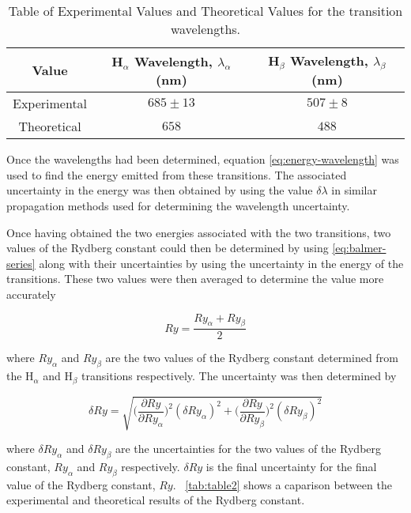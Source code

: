 \documentclass{article}
\newcommand{\tabref}[2][\tablename~]{#1\ref{#2}}
\begin{document}
\vspace{5mm}
\begin{table*}[h]
\centering %
\caption{Table of Experimental Values and Theoretical Values for the transition wavelengths.}
\label{tab:table1}
\begin{tabular}{|c|c|c|}
\hline
Value & H$_\alpha$ Wavelength, $\lambda_{\alpha}$ (nm) & H$_\beta$ Wavelength, $\lambda_{\beta}$ (nm) \\
\hline
Experimental & $685 \pm 13$ & $507 \pm 8$ \\
\hline
Theoretical \cite{Paper01} & $658$ & $488$ \\
\hline
\end{tabular}
\end{table*}


\vspace{2mm}
\noindent
Once the wavelengths had been determined, equation \eqref{eq:energy-wavelength} was used to find the energy emitted from these transitions. The associated uncertainty in the energy was then obtained by using the value $\delta\lambda$ in similar propagation methods used for determining the wavelength uncertainty. 

\vspace{2mm}
\noindent
Once having obtained the two energies associated with the two transitions, two values of the Rydberg constant could then be determined by using \eqref{eq:balmer-series} along with their uncertainties by using the uncertainty in the energy of the transitions. These two values were then averaged to determine the value more accurately

\begin{equation}
\label{eq:Rydberg-const}
Ry = \frac{Ry_{\alpha} + Ry_{\beta}}{2}
\end{equation}

\vspace{2mm}
\noindent
where $Ry_{\alpha}$ and $Ry_{\beta}$ are the two values of the Rydberg constant determined from the H$_\alpha$ and H$_\beta$ transitions respectively. The uncertainty was then determined by

\begin{equation}
\label{eq:Rydberg-error}
\delta Ry = \sqrt{\bigg(\frac{\partial{Ry}}{\partial{Ry_{\alpha}}}\bigg)^2 (\delta Ry_{\alpha})^2 + \bigg(\frac{\partial{Ry}}{\partial{Ry_{\beta}}}\bigg)^2 (\delta Ry_{\beta})^2}
\end{equation}

\vspace{2mm}
\noindent
where $\delta Ry_{\alpha}$ and $\delta Ry_{\beta}$ are the uncertainties for the two values of the Rydberg constant,  $Ry_{\alpha}$ and $Ry_{\beta}$ respectively. $\delta Ry$ is the final uncertainty for the final value of the Rydberg constant, $Ry$. \tabref{tab:table2} shows a caparison between the experimental and theoretical results of the Rydberg constant.
\end{document}
